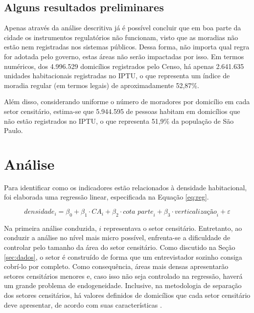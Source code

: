 \section*{Alguns resultados preliminares}

Apenas através da análise descritiva já é possível concluir que em boa parte da cidade os instrumentos regulatórios não funcionam, visto que as moradias não estão nem registradas nos sistemas públicos. Dessa forma, não importa qual regra for adotada pelo governo, estas áreas não serão impactadas por isso. Em termos numéricos, dos 4.996.529 domicílios registrados pelo Censo, há apenas 2.641.635 unidades habitacionais registradas no IPTU, o que representa um índice de moradia regular (em termos legais) de aproximadamente 52,87\%. 

Além disso, considerando uniforme o número de moradores por domicílio em cada setor censitário, estima-se que 5.944.595 de pessoas habitam em domicílios que não estão registrados no IPTU, o que representa 51,9\% da população de São Paulo.



\chapter{Análise}

Para identificar como os indicadores estão relacionados à densidade habitacional, foi elaborada uma regressão linear, especificada na Equação \ref{eq:reg}. 

\begin{equation}
    \textit{densidade}_i = \beta_0 + \beta_1 \cdot \textit{CA}_i + \beta_2 \cdot\textit{cota parte}_i + \beta_3\cdot\textit{verticalização}_i + \varepsilon
    \label{eq:reg}
\end{equation}

Na primeira análise conduzida, $i$ representava o setor censitário. Entretanto, ao conduzir a análise no nível mais micro possível, enfrenta-se a dificuldade de controlar pelo tamanho da área do setor censitário. Como discutido na Seção \ref{sec:dados}, o setor é construído de forma que um entrevistador sozinho consiga cobrí-lo por completo. Como consequência, áreas mais densas apresentarão setores censitários menores e, caso isso não seja controlado na regressão, haverá um grande problema de endogeneidade. Inclusive, na metodologia de separação dos setores censitários, há valores definidos de domicílios que cada setor censitário deve apresentar, de acordo com suas características \cite{IBGE2024}.

